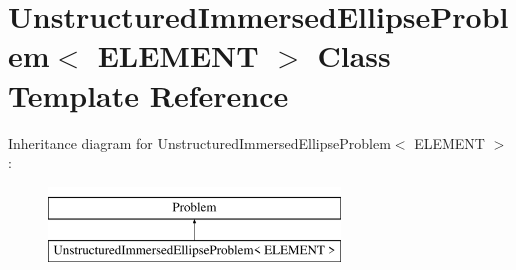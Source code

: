 \hypertarget{classUnstructuredImmersedEllipseProblem}{}\section{Unstructured\+Immersed\+Ellipse\+Problem$<$ E\+L\+E\+M\+E\+NT $>$ Class Template Reference}
\label{classUnstructuredImmersedEllipseProblem}
Inheritance diagram for Unstructured\+Immersed\+Ellipse\+Problem$<$ E\+L\+E\+M\+E\+NT $>$\+:\begin{figure}[H]
\begin{center}
\leavevmode
\includegraphics[height=2.000000cm]{classUnstructuredImmersedEllipseProblem}
\end{center}
\end{figure}
